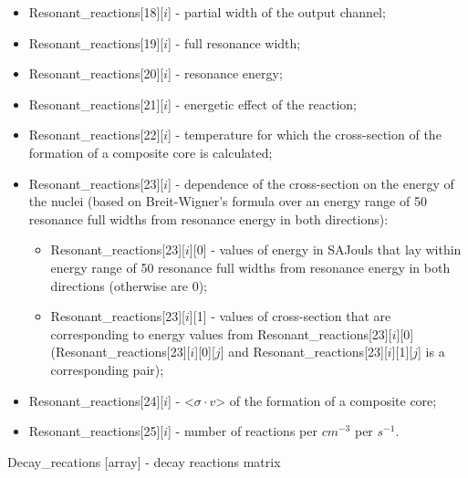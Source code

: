 \documentclass[a4paper,12pt]{article}
\begin{document}
{\begin{itemize}
    \item Resonant\_reactions[18][$i$] - partial width of the output channel;
    \item Resonant\_reactions[19][$i$] - full resonance width;
    \item Resonant\_reactions[20][$i$] - resonance energy;
    \item Resonant\_reactions[21][$i$] - energetic effect of the reaction;
    \item Resonant\_reactions[22][$i$] - temperature for which the cross-section of the formation of a composite core is calculated;
    \item Resonant\_reactions[23][$i$] - dependence of the cross-section on the energy of the nuclei (based on Breit-Wigner's formula over an energy range of 50 resonance full widths from resonance energy in both directions):
    \begin{itemize}
    \item Resonant\_reactions[23][$i$][0] - values of energy in SAJouls that lay within energy range of 50 resonance full widths from resonance energy in both directions (otherwise are 0);
    \item Resonant\_reactions[23][$i$][1] - values of cross-section that are corresponding to energy values from Resonant\_reactions[23][$i$][0] \\ (Resonant\_reactions[23][$i$][0][$j$] and Resonant\_reactions[23][$i$][1][$j$] is a corresponding pair);
    \end{itemize}
    \item Resonant\_reactions[24][$i$] - <$\sigma \cdot v$> of the formation of a composite core;
    \item Resonant\_reactions[25][$i$] - number of reactions per $cm^{-3}$ per $s^{-1}$.
\end{itemize}


}{Decay\_recations [array] - decay reactions matrix}

\vspace{1em}
\end{document}
